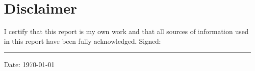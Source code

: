 \chapter{Disclaimer}
I certify that this report is my own work and that all sources of information used in this report have been fully acknowledged.
\vfill
\noindent Signed: \rule[0.25em]{15em}{0.5pt} \hfill Date: {\today}
